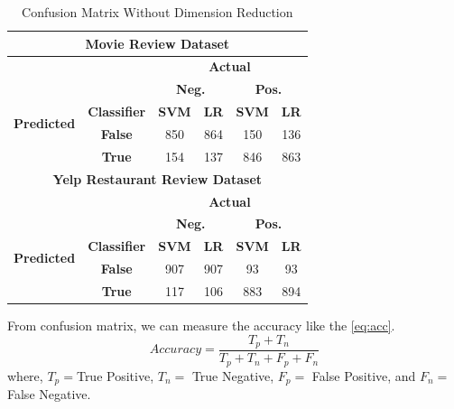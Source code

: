 \documentclass[10pt, conference]{IEEEtran}
\begin{document}
		\begin{table}[H]
		\caption{Confusion Matrix Without Dimension Reduction}
		\begin{center}
			\begin{tabular}{|*{6}{c|}}
			    \hline
			    \multicolumn{6}{|c|}{\textbf{Movie Review Dataset}}\\
				\hline
				\multicolumn{2}{|c|}{\textbf{}} & \multicolumn{4}{|c|}{\textbf{Actual}}\\
				\hline
				\multirow{4}{*}{\begin{sideways}\textbf{Predicted}\end{sideways}} & & \multicolumn{2}{|c|}{\textbf{Neg.}} & \multicolumn{2}{|c|}{\textbf{Pos.}}\\
				\cline{2-6}
				& \textbf{Classifier} & \textbf{SVM} & \textbf{LR} & \textbf{SVM} & \textbf{LR}\\  \cline{2-6}
				& \textbf{False} & 850 & 864 & 150 & 136\\
				\cline{2-6}
				& \textbf{True} & 154 & 137 & 846 & 863\\
				\hline
				\hline
			    \multicolumn{6}{|c|}{\textbf{Yelp Restaurant Review Dataset}}\\
				\hline
				\multicolumn{2}{|c|}{\textbf{}} & \multicolumn{4}{|c|}{\textbf{Actual}}\\
				\hline
				\multirow{4}{*}{\begin{sideways}\textbf{Predicted}\end{sideways}} & & \multicolumn{2}{|c|}{\textbf{Neg.}} & \multicolumn{2}{|c|}{\textbf{Pos.}}\\
				\cline{2-6}
				& \textbf{Classifier} & \textbf{SVM} & \textbf{LR} & \textbf{SVM} & \textbf{LR}\\  \cline{2-6}
				& \textbf{False} & 907 & 907 & 93 & 93\\
				\cline{2-6}
				& \textbf{True} & 117 & 106 & 883 & 894\\
				\hline
			\end{tabular}
			\label{table:comp}
		\end{center}
	\end{table}
	From confusion matrix, we can measure the accuracy like the \eqref{eq:acc}.
	\begin{equation}
	    Accuracy = \dfrac{T_p + T_n}{T_p + T_n + F_p + F_n}
	    \label{eq:acc}
	\end{equation}
	where, $T_p = $True Positive, $T_n = $ True Negative, $F_p = $ False Positive, and $F_n = $ False Negative.
	
\end{document}
